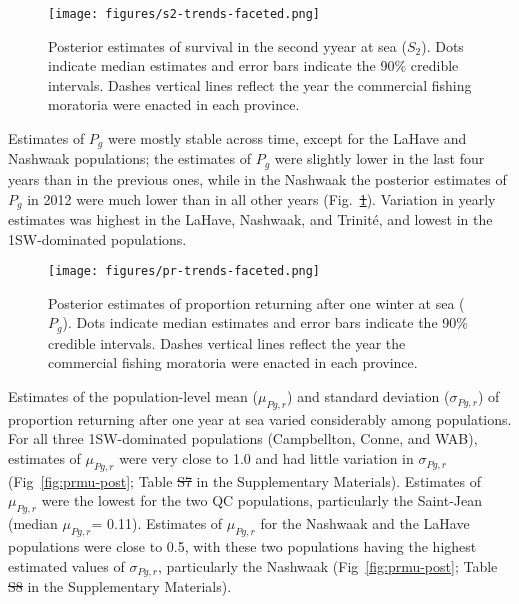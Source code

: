 \documentclass[12pt]{article}
\newcommand{\St}{$S_{2}$\xspace}
\newcommand{\Pg}{$P_g$\xspace}
\newcommand{\prmu}{$\mu_{Pg,r}$\xspace}
\newcommand{\prsig}{$\sigma_{Pg,r}$\xspace}
\providecommand{\DIFaddtex}[1]{{\protect\color{blue}\uwave{#1}}} %
\providecommand{\DIFdeltex}[1]{{\protect\color{red}\sout{#1}}}                      %
\providecommand{\DIFaddbegin}{} %
\providecommand{\DIFaddend}{} %
\providecommand{\DIFdelbegin}{} %
\providecommand{\DIFdelend}{} %
\providecommand{\DIFadd}[1]{\texorpdfstring{\DIFaddtex{#1}}{#1}} %
\providecommand{\DIFdel}[1]{\texorpdfstring{\DIFdeltex{#1}}{}} %
\begin{document}
\begin{figure}[htbp] \centering
    \texttt{[image: figures/s2-trends-faceted.png]}
    \caption{Posterior estimates of survival in the second yyear at sea (\St).
 Dots indicate median estimates and error bars indicate the 90\% credible
 intervals. Dashes vertical lines reflect the year the commercial fishing
 moratoria were enacted in each province.} \label{fig:s2-faceted}
\end{figure}
Estimates of \Pg were mostly stable across time, except for the LaHave and
Nashwaak populations; \DIFaddbegin \DIFadd{for the La Have }\DIFaddend the estimates of \Pg were slightly lower in the last
four years than in the previous ones, while in the Nashwaak the posterior
estimates of \Pg in 2012 were much lower than in all other years
(Fig.~\DIFdelbegin \DIFdel{\ref{fig:s2-faceted}}\DIFdelend \DIFaddbegin \DIFadd{\ref{fig:pr-faceted}}\DIFaddend ). Variation in yearly estimates was highest in the
LaHave, Nashwaak, and Trinit\'{e}, and lowest in the 1SW-dominated
populations.

\begin{figure}[htbp]
 \centering
    \texttt{[image: figures/pr-trends-faceted.png]}
    \caption{Posterior estimates of proportion returning after one winter at sea (\Pg).
 Dots indicate median estimates and error
        bars indicate the 90\% credible intervals. Dashes vertical lines reflect the year the commercial fishing moratoria were enacted
    in each province.} \label{fig:pr-faceted}

\end{figure}
Estimates of the population-level mean (\prmu) and standard deviation (\prsig)
of proportion returning after one year at sea varied considerably among populations.
For all
three 1SW-dominated populations (Campbellton, Conne, and WAB), estimates of \prmu
were very close to 1.0 and had little variation in \prsig (Fig~\ref{fig:prmu-post}; Table \DIFdelbegin \DIFdel{S7 }\DIFdelend \DIFaddbegin \DIFadd{S10 }\DIFaddend in the Supplementary Materials).
Estimates of \prmu were the lowest for the two QC populations, particularly the Saint-Jean (median \prmu = 0.11).
Estimates of \prmu for the Nashwaak and the LaHave populations were close to 0.5, with these two populations having
the highest estimated values of \prsig, particularly the Nashwaak (Fig~\ref{fig:prmu-post};  Table \DIFdelbegin \DIFdel{S8 }\DIFdelend \DIFaddbegin \DIFadd{S11 }\DIFaddend in the Supplementary Materials).
\end{document}
